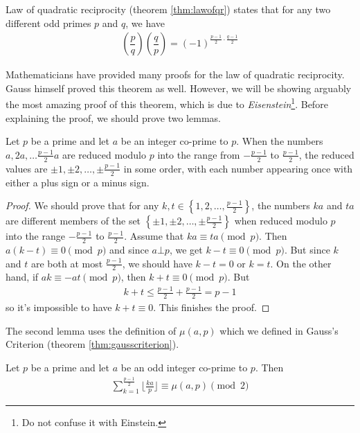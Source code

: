 \documentclass{subfile}
\begin{document}
Law of quadratic reciprocity (theorem \eqref{thm:lawofqr}) states that for any two different odd primes $p$ and $q$, we have
\begin{align*}
\left(\dfrac{p}{q}\right)\left(\dfrac{q}{p}\right)=(-1)^{\frac{p-1}{2}\cdot \frac{q-1}{2}}
\end{align*}

Mathematicians have provided many proofs for the law of quadratic reciprocity. Gauss himself proved this theorem as well. However, we will be showing arguably the most amazing proof of this theorem, which is due to \textit{Eisenstein}\footnote{Do not confuse it with Einstein.}.
Before explaining the proof, we should prove two lemmas.

\begin{lemma}\label{lem:lawofqrlem1}
	Let $p$ be a prime and let $a$ be an integer co-prime to $p$. When the numbers $a, 2a, \ldots \frac{p-1}{2}a$ are reduced modulo $p$ into the range from $-\frac{p-1}{2}$ to $\frac{p-1}{2}$, the reduced values are $\pm 1, \pm 2, \dots, \pm \frac{p-1}{2}$ in some order, with each number appearing once with either a plus sign or a minus sign.
\end{lemma}

\begin{proof}\label{lem:lawofqrlem2}
	We should prove that for any $k, t \in \left\{1, 2, \dots, \frac{p-1}{2}\right\}$, the numbers $ka$ and $ta$ are different members of the set $\left\{ \pm 1, \pm 2, \dots, \pm \frac{p-1}{2} \right\}$ when reduced modulo $p$ into the range $-\frac{p-1}{2}$ to $\frac{p-1}{2}$. Assume that $ka \equiv ta \pmod p$. Then $a(k-t) \equiv 0 \pmod p$ and since $a \bot p$, we get $k-t \equiv 0 \pmod p$. But since $k$ and $t$ are both at most $\frac{p-1}{2}$, we should have $k-t=0$ or $k=t$. On the other hand, if $ak \equiv -at \pmod p$, then $k+t \equiv 0 \pmod p$. But
	\begin{align*}
	k+t \leq \frac{p-1}{2} + \frac{p-1}{2} = p-1
	\end{align*}
	so it's impossible to have $k+t \equiv 0$. This finishes the proof.
\end{proof}

The second lemma uses the definition of $\mu(a,p)$ which we defined in Gauss's Criterion (theorem \eqref{thm:gausscriterion}).

\begin{lemma}
	Let $p$ be a prime and let $a$ be an odd integer co-prime to $p$. Then
	\begin{align*}
		\sum_{k=1}^{\frac{p-1}{2}} \Big\lfloor\frac{ka}{p} \Big\rfloor \equiv \mu(a,p) \pmod 2
	\end{align*}
\end{lemma}
\end{document}
